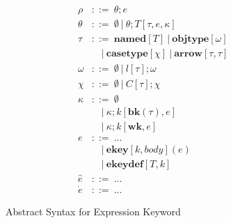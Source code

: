 \begin{figure*}[htb!]
\begin{align*}
      \rho        &::=~ \theta;e\\
      \theta      &::=~ \emptyset ~ | ~ \theta; T[\tau,e,\kappa]\\
      \tau        &::=~ \mathbf{named}[T] ~ | ~ \mathbf{objtype}[\omega] \\
                  &\quad | ~ \mathbf{casetype}[\chi] ~ | ~ \mathbf{arrow}[\tau,\tau]\\
      \omega      &::=~\emptyset ~|~ l[\tau];\omega\\
      \chi        &::=~\emptyset ~|~ C[\tau];\chi\\
      \kappa      &::=~ \emptyset \\
                  &\quad | ~ \kappa;k[\mathbf{bk}(\tau),e] \\
                  &\quad | ~ \kappa;k[\mathbf{wk},e] \\
      e           &::=~ ...\\
                  &\quad |~ \mathbf{ekey}[k,body](e) \\
                  &\quad |~ \mathbf{ekeydef}[T,k]\\
      \hat{e}     &::=~ ...\\
      \dot{e}     &::=~ ...
\end{align*}
\caption{Abstract Syntax for Expression Keyword}
\label{formal-syntax}
\end{figure*}